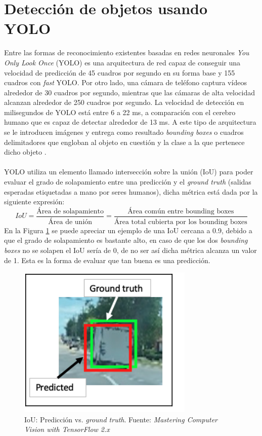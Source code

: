 \section{Detección de objetos usando YOLO}
Entre las formas de reconocimiento existentes basadas en redes neuronales \textit{You Only Look Once} (YOLO) es una arquitectura de red capaz de conseguir una velocidad de predicción de 45 cuadros por segundo en su forma base y 155 cuadros con \textit{fast} YOLO. Por otro lado, una cámara de teléfono captura vídeos alrededor de 30 cuadros por segundo, mientras que las cámaras de alta velocidad alcanzan alrededor de 250 cuadros por segundo. La velocidad de detección en milisegundos de YOLO está entre 6 a 22 ms, a comparación con el cerebro humano que es capaz de detectar alrededor de 13 ms. A este tipo de arquitectura se le introducen imágenes y entrega como resultado \textit{bounding boxes} o cuadros delimitadores que engloban al objeto en cuestión y la clase a la que pertenece dicho objeto \cite[p~188]{Krishnendu}.
\\
\\
YOLO utiliza un elemento llamado intersección sobre la unión (IoU) para poder evaluar el grado de solapamiento entre una predicción y el \textit{ground truth} (salidas esperadas etiquetadas a mano por seres humanos), dicha métrica está dada por la siguiente expresión: 
\begin{equation}
    IoU = \frac{\text{Área de solapamiento}}{\text{Área de unión}} = \frac{\text{Área común entre bounding boxes}}{\text{Área total cubierta por los bounding boxes}}
\end{equation}
En la Figura \ref{IoU} se puede apreciar un ejemplo de una IoU cercana a 0.9, debido a que el grado de solapamiento es bastante alto, en caso de que los dos \textit{bounding boxes} no se solapen el IoU sería de 0, de no ser así dicha métrica alcanza un valor de 1. Esta es la forma de evaluar que tan buena es una predicción.
\begin{figure}[H]
    \centering
    \includegraphics{Recursos/iou.png}
    \caption[IoU: Predicción vs. \textit{ground truth}.]{IoU: Predicción vs. \textit{ground truth}. {\footnotesize Fuente: \textit{Mastering Computer Vision with TensorFlow 2.x} \cite[p~189]{Krishnendu}}}
    \label{IoU}
\end{figure}
